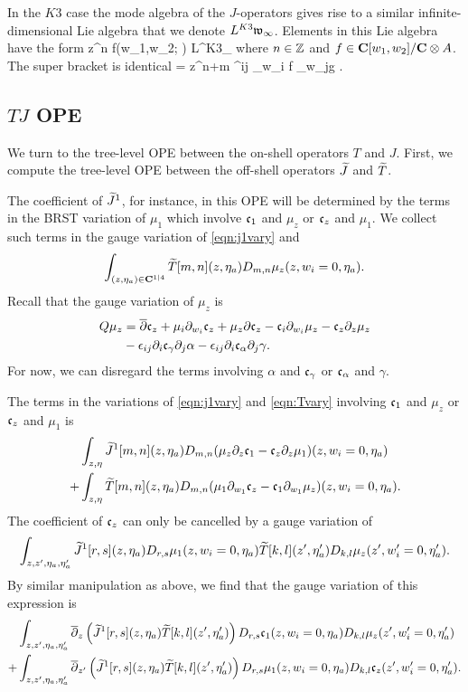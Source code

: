 \documentclass[../main.tex]{subfiles}
\begin{document}
In the $K3$ case the mode algebra of the $J$-operators gives rise to a similar infinite-dimensional Lie algebra that we denote $L^{K3}\mathfrak{w}_\infty$.
Elements in this Lie algebra have the form
\beqn
z^{n} f(w_1,w_2; \eta) \in L^{K3}\fw_\infty 
\eeqn
where $n \in \mathbb Z$ and $f \in \mathbf{C}[w_1,w_2] \slash \mathbf{C} \otimes A$.
The super bracket is identical 
\beqn
[z^n f, z^m g] = z^{n+m} \eps^{ij} \del_{w_i} f \del_{w_j}g .
\eeqn

\subsection{$TJ$ OPE}

We turn to the tree-level OPE between the on-shell operators $T$ and $J$. 
First, we compute the tree-level OPE between the off-shell operators $\widetilde{J}$ and $\widetilde{T}$. 

The coefficient of $\widetilde{J}^1$, for instance, in this OPE will be determined by the terms in the BRST variation of $\mu_1$ which involve $\mathfrak{c}_1$ and $\mu_z$ or $\mathfrak{c}_z$ and $\mu_1$. 
We collect such terms in the gauge variation of \eqref{eqn:j1vary} and 
\begin{equation}\label{eqn:Tvary}
\int_{(z,\eta_a) \in \mathbf{C}^{1|4}} \widetilde{T} [m,n] (z,\eta_a) D_{m,n} \mu_z(z, w_i=0, \eta_a) .
\end{equation}
Recall that the gauge variation of $\mu_z$ is
\begin{align*}
Q \mu_z & = \overline{\partial} \mathfrak{c}_z + \mu_i \partial_{w_i} \mathfrak{c}_z + \mu_z \partial \mathfrak{c}_z - \mathfrak{c}_i \partial_{w_i} \mu_z - \mathfrak{c}_z \partial_z \mu_z \\
& -\epsilon_{ij} \partial_i \mathfrak{c}_\gamma \partial_j \alpha - \epsilon_{ij} \partial_i \mathfrak{c}_\alpha \partial_j \gamma .
\end{align*}
For now, we can disregard the terms involving $\alpha$ and $\mathfrak{c}_\gamma$ or $\mathfrak{c}_\alpha$ and $\gamma$.

The terms in the variations of \eqref{eqn:j1vary} and \eqref{eqn:Tvary} involving $\mathfrak{c}_1$ and $\mu_z$ or $\mathfrak{c}_z$ and $\mu_1$ is
\begin{align*}
& \int_{z, \eta} \widetilde{J}^1[m,n](z,\eta_a) D_{m,n} (\mu_z \partial_{z} \mathfrak{c}_1 - \mathfrak{c}_z \partial_z \mu_1) (z, w_i=0,\eta_a) \\
+ & \int_{z,\eta} \widetilde{T} [m,n](z,\eta_a) D_{m,n}(\mu_1 \partial_{w_1} \mathfrak{c}_z - \mathfrak{c}_1 \partial_{w_1} \mu_z) (z, w_i=0, \eta_a).
\end{align*}
The coefficient of $\mathfrak{c}_z$ can only be cancelled by a gauge variation of 
\[
\int_{z,z',\eta_a,\eta_a'} \widetilde{J}^1 [r,s] (z,\eta_a) D_{r,s} \mu_1(z,w_i=0,\eta_a) \widetilde{T} [k,l] (z',\eta_a') D_{k,l} \mu_z(z',w_i'=0,\eta_a') .
\]
By similar manipulation as above, we find that the gauge variation of this expression is 
\begin{align*}
& \int_{z,z',\eta_a,\eta_a'} \overline{\partial}_{z} \left(\widetilde{J}^1 [r,s] (z,\eta_a) \widetilde{T}[k,l](z',\eta_a')\right) D_{r,s} \mathfrak{c}_1 (z,w_i=0,\eta_a) D_{k,l} \mu_z (z',w'_i=0,\eta_a') \\
+ & \int_{z,z',\eta_a,\eta_a'} \overline{\partial}_{z'} \left(\widetilde{J}^1 [r,s] (z,\eta_a) \widetilde{T}[k,l](z',\eta_a')\right) D_{r,s} \mu_1 (z,w_i=0,\eta_a) D_{k,l} \mathfrak{c}_z (z',w'_i=0,\eta_a').
\end{align*}
\end{document}
